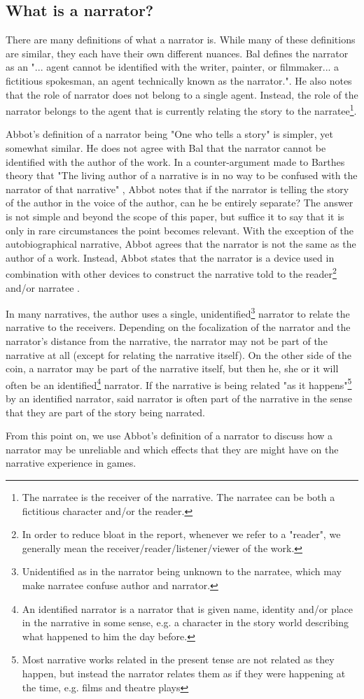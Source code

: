 \subsection{What is a narrator?}
There are many definitions of what a narrator is. 
While many of these definitions are similar, they each have their own different nuances. 
Bal defines the narrator as an "... agent cannot be identified with the writer, painter, or filmmaker... a fictitious spokesman, an agent technically known as the narrator."\cite[p. 8]{Bal}. 
He also notes that the role of narrator does not belong to a single agent. Instead, the role of the narrator belongs to the agent that is currently relating the story to the narratee\footnote{The narratee is the receiver of the narrative. The narratee can be both a fictitious character and/or the reader.}. 

Abbot's definition of a narrator being "One who tells a story"\cite[p. 238]{Abbot} is simpler, yet somewhat similar. 
He does not agree with Bal that the narrator cannot be identified with the author of the work. 
In a counter-argument made to Barthes theory that "The living author of a narrative is in no way to be confused with the narrator of that narrative" \cite[p. 261]{Barthes}, Abbot notes that if the narrator is telling the story of the author in the voice of the author, can he be entirely separate? 
The answer is not simple and beyond the scope of this paper, but suffice it to say that it is only in rare circumstances the point becomes relevant. 
With the exception of the autobiographical narrative, Abbot agrees that the narrator is not the same as the author of a work.
Instead, Abbot states that the narrator is a device used in combination with other devices to construct the narrative told to the reader\footnote{In order to reduce bloat in the report, whenever we refer to a "reader", we generally mean the receiver/reader/listener/viewer of the work.} and/or narratee \cite[p. 69]{Abbot}.

In many narratives, the author uses a single, unidentified\footnote{Unidentified as in the narrator being unknown to the narratee, which may make narratee confuse author and narrator.} narrator to relate the narrative to the receivers. 
Depending on the focalization of the narrator and the narrator's distance from the narrative, the narrator may not be part of the narrative at all (except for relating the narrative itself). 
On the other side of the coin, a narrator may be part of the narrative itself, but then he, she or it will often be an identified\footnote{An identified narrator is a narrator that is given name, identity and/or place in the narrative in some sense, e.g. a character in the story world describing what happened to him the day before.} narrator. 
If the narrative is being related "as it happens"\footnote{Most narrative works related in the present tense are not related as they happen, but instead the narrator relates them as if they were happening at the time, e.g. films and theatre plays} by an identified narrator, said narrator is often part of the narrative in the sense that they are part of the story being narrated.

From this point on, we use Abbot's definition of a narrator to discuss how a narrator may be unreliable and which effects that they are might have on the narrative experience in games.